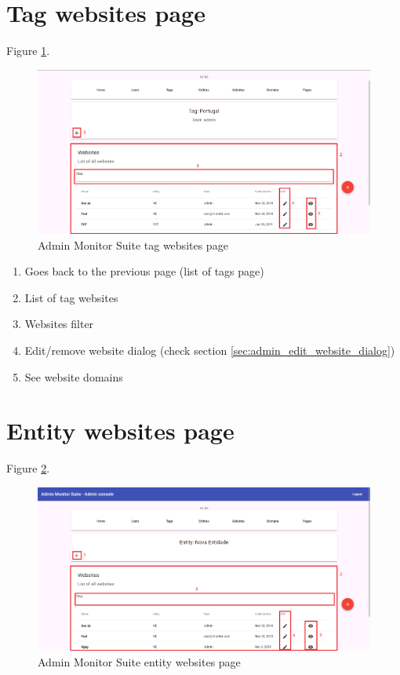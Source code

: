 \clearpage

\section{Tag websites page}

Figure \ref{fig:admin_tag_websites_page}.

\begin{figure}[H]
    \centering
    \includegraphics[width=\linewidth]{lib/images/admin/admin_tag_websites_page.png}
    \caption{Admin Monitor Suite tag websites page}
    \label{fig:admin_tag_websites_page}
\end{figure}

\begin{enumerate}
    \item Goes back to the previous page (list of tags page)
    \item List of tag websites
    \item Websites filter
    \item Edit/remove website dialog (check section \ref{sec:admin_edit_website_dialog})
    \item See website domains
\end{enumerate}

\clearpage

\section{Entity websites page}

Figure \ref{fig:admin_entity_websites_page}.

\begin{figure}[H]
    \centering
    \includegraphics[width=\linewidth]{lib/images/admin/admin_entity_websites_page.png}
    \caption{Admin Monitor Suite entity websites page}
    \label{fig:admin_entity_websites_page}
\end{figure}

